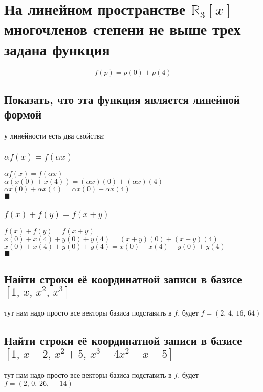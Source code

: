 \documentclass{article}
\newcommand{\R}{\mathbb{R}}
\renewcommand{\l}{\left}
\renewcommand{\r}{\right}
\begin{document}
  \section{На линейном пространстве $\R_3[x]$ многочленов степени не выше трех задана функция}
  $$ f(p) = p(0) + p(4) $$

  \subsection{Показать, что эта функция является линейной формой}
  у линейности есть два свойства:
  \subsubsection{$\alpha f(x) = f(\alpha x)$}
  $\alpha f(x) = f(\alpha x)$ \\
  $\alpha (x(0) + x(4)) = (\alpha x)(0) + (\alpha x)(4)$ \\
  $\alpha x(0) + \alpha x(4) = \alpha x(0) + \alpha x(4)$ \\
  $\blacksquare$

  \subsubsection{$f(x)+f(y) = f(x+y)$}
  $f(x)+f(y) = f(x+y)$ \\
  $x(0)+x(4) + y(0)+y(4) = (x+y)(0) + (x+y)(4)$ \\
  $x(0)+x(4) + y(0)+y(4) = x(0)+x(4) + y(0)+y(4)$ \\
  $\blacksquare$

  \subsection{Найти строки её координатной записи в базисе $[1,\, x,\, x^2,\, x^3]$}
  тут нам надо просто все векторы базиса подставить в $f$, будет $f = \l(2,\, 4,\, 16,\, 64\r)$

  \subsection{Найти строки её координатной записи в базисе $[1,\, x-2,\, x^2 + 5,\, x^3 - 4x^2 - x - 5]$}
  тут нам надо просто все векторы базиса подставить в $f$, будет $f = \l(2,\, 0,\, 26,\, -14\r)$
\end{document}
